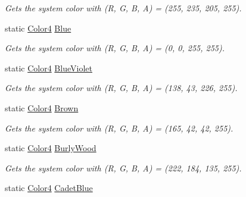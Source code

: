 \begin{DoxyCompactItemize}
\begin{DoxyCompactList}\small\item\em Gets the system color with (R, G, B, A) = (255, 235, 205, 255). \end{DoxyCompactList}\item 
static \hyperlink{struct_open_t_k_1_1_graphics_1_1_color4}{Color4} \hyperlink{struct_open_t_k_1_1_graphics_1_1_color4_ab796fa9830cd7593fbe9c13146d2aac2}{Blue}
\begin{DoxyCompactList}\small\item\em Gets the system color with (R, G, B, A) = (0, 0, 255, 255). \end{DoxyCompactList}\item 
static \hyperlink{struct_open_t_k_1_1_graphics_1_1_color4}{Color4} \hyperlink{struct_open_t_k_1_1_graphics_1_1_color4_adcd73651a42a8f1fc4c2e9559a375a96}{Blue\-Violet}
\begin{DoxyCompactList}\small\item\em Gets the system color with (R, G, B, A) = (138, 43, 226, 255). \end{DoxyCompactList}\item 
static \hyperlink{struct_open_t_k_1_1_graphics_1_1_color4}{Color4} \hyperlink{struct_open_t_k_1_1_graphics_1_1_color4_a5648e4713f111695c7b6528e55178d08}{Brown}
\begin{DoxyCompactList}\small\item\em Gets the system color with (R, G, B, A) = (165, 42, 42, 255). \end{DoxyCompactList}\item 
static \hyperlink{struct_open_t_k_1_1_graphics_1_1_color4}{Color4} \hyperlink{struct_open_t_k_1_1_graphics_1_1_color4_af9877e482b09f11c6dd853cf52e2fb30}{Burly\-Wood}
\begin{DoxyCompactList}\small\item\em Gets the system color with (R, G, B, A) = (222, 184, 135, 255). \end{DoxyCompactList}\item 
static \hyperlink{struct_open_t_k_1_1_graphics_1_1_color4}{Color4} \hyperlink{struct_open_t_k_1_1_graphics_1_1_color4_a9f94587869d7ce96b37667b6284a45e8}{Cadet\-Blue}

\end{DoxyCompactItemize}
